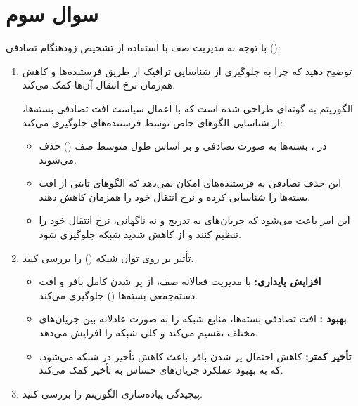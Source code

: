 \section{سوال سوم}

با توجه به مدیریت صف با استفاده از تشخیص زودهنگام تصادفی ():

\begin{enumerate}
	\item 
	توضیح دهید که چرا  به جلوگیری از شناسایی ترافیک  از طریق فرستنده‌ها و کاهش هم‌زمان نرخ انتقال آن‌ها کمک می‌کند.
	
	\begin{qsolve}
		الگوریتم  به گونه‌ای طراحی شده است که با اعمال سیاست افت تصادفی بسته‌ها، از شناسایی الگوهای خاص توسط فرستنده‌های  جلوگیری می‌کند:
		\begin{itemize}
			\item در ، بسته‌ها به صورت تصادفی و بر اساس طول متوسط صف () حذف می‌شوند.
			\item این حذف تصادفی به فرستنده‌های  امکان نمی‌دهد که الگوهای ثابتی از افت بسته‌ها را شناسایی کرده و نرخ انتقال خود را همزمان کاهش دهند.
			\item این امر باعث می‌شود که جریان‌های  به تدریج و نه ناگهانی، نرخ انتقال خود را تنظیم کنند و از کاهش شدید  شبکه جلوگیری شود.
		\end{itemize}
	\end{qsolve}
	
	
	\item 
	تأثیر  بر روی توان شبکه () را بررسی کنید.
	\begin{qsolve}
		\begin{itemize}
			\item \textbf{افزایش پایداری:}  با مدیریت فعالانه صف، از پر شدن کامل بافر و افت دسته‌جمعی بسته‌ها () جلوگیری می‌کند.
			\item \textbf{بهبود :} افت تصادفی بسته‌ها، منابع شبکه را به صورت عادلانه بین جریان‌های مختلف تقسیم می‌کند و  کلی شبکه را افزایش می‌دهد.
			\item \textbf{تأخیر کمتر:} کاهش احتمال پر شدن بافر باعث کاهش تأخیر در شبکه می‌شود، که به بهبود عملکرد جریان‌های حساس به تأخیر کمک می‌کند.
		\end{itemize}
	\end{qsolve}
	
	
	\item 
	پیچیدگی پیاده‌سازی الگوریتم  را بررسی کنید.
	

\end{enumerate}
